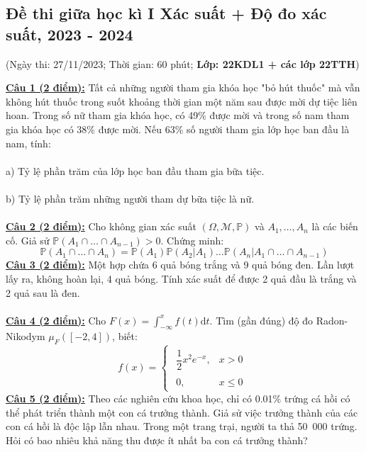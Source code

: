 \documentclass[10pt, a4paper]{article}
\begin{document}
\newpage

\subsection{Đề thi giữa học kì I Xác suất + Độ đo xác suất, 2023 - 2024}
\begin{center}
	\color{blue}(Ngày thi: 27/11/2023; Thời gian: 60 phút; \textbf{Lớp: 22KDL1 + các lớp 22TTH})
\end{center}
\color{red}\underline{\textbf{Câu 1 (2 điểm):}} \color{black}Tất cả những người tham gia khóa học "bỏ hút thuốc" mà vẫn không hút thuốc trong suốt khoảng thời gian một năm sau được mời dự tiệc liên hoan. Trong số nữ tham gia khóa học, có 49\% được mời và trong số nam tham gia khóa học có 38\% được mời. Nếu 63\% số người tham gia lớp học ban đầu là nam, tính:\\\\
\color{red}a) \color{black}Tỷ lệ phần trăm của lớp học ban đầu tham gia bữa tiệc.\\\\
\color{red}b) \color{black}Tỷ lệ phần trăm những người tham dự bữa tiệc là nữ.\\\\
\color{red}\underline{\textbf{Câu 2 (2 điểm):}} \color{black}Cho không gian xác suất $(\Omega,\mathcal M,\mathbb P)$ và $A_1,\dots,A_n$ là các biến cố. Giả sử $\mathbb P(A_1\cap\ldots\cap A_{n-1})>0$. Chứng minh: $$\mathbb P(A_1\cap\ldots\cap A_n)=\mathbb P(A_1)\mathbb P(A_2|A_1)\ldots\mathbb P(A_n|A_1\cap\ldots\cap A_{n-1})$$
\color{red}\underline{\textbf{Câu 3 (2 điểm):}} \color{black}Một hợp chứa 6 quả bóng trắng và 9 quả bóng đen. Lần lượt lấy ra, không hoàn lại, 4 quả bóng. Tính xác suất để được 2 quả đầu là trắng và 2 quả sau là đen.\\\\
\color{red}\underline{\textbf{Câu 4 (2 điểm):}} \color{black}Cho $F(x)=\displaystyle\int_{-\infty}^xf(t)\text{d}t$. Tìm (gần đúng) độ đo Radon-Nikodym $\mu_F([-2,4])$, biết: $$f(x)=\begin{cases}
\begin{array}{ll}
	\dfrac12x^2e^{-x}, & x>0\\\\
	0, & x\le0
\end{array}
\end{cases}$$
\color{red}\underline{\textbf{Câu 5 (2 điểm):}} \color{black}Theo các nghiên cứu khoa học, chỉ có 0.01\% trứng cá hồi có thể phát triển thành một con cá trưởng thành. Giả sử việc trưởng thành của các con cá hồi là độc lập lẫn nhau. Trong một trang trại, người ta thả 50~000 trứng. Hỏi có bao nhiêu khả năng thu được ít nhất ba con cá trưởng thành?
\end{document}
